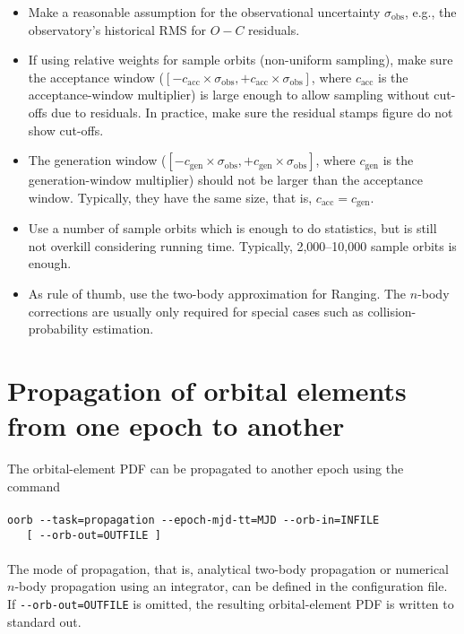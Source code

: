 \documentclass[12pt,english,twoside,a4paper]{report}
\begin{document}
\begin{itemize}

\item Make a reasonable assumption for the observational uncertainty
  $\sigma_\mathrm{obs}$, e.g., the observatory's historical RMS for
  $O-C$ residuals.

\item If using relative weights for sample orbits (non-uniform
  sampling), make sure the acceptance window ($[-c_\mathrm{acc} \times
    \sigma_\mathrm{obs},+c_\mathrm{acc} \times \sigma_\mathrm{obs}]$,
  where $c_\mathrm{acc}$ is the acceptance-window multiplier) is large
  enough to allow sampling without cut-offs due to residuals. In
  practice, make sure the residual stamps figure do not show cut-offs.

\item The generation window ($[-c_\mathrm{gen} \times
  \sigma_\mathrm{obs},+c_\mathrm{gen} \times \sigma_\mathrm{obs}]$,
  where $c_\mathrm{gen}$ is the generation-window multiplier) should
  not be larger than the acceptance window. Typically, they have the
  same size, that is, $c_\mathrm{acc}=c_\mathrm{gen}$.

\item Use a number of sample orbits which is enough to do statistics,
  but is still not overkill considering running time. Typically,
  2,000--10,000 sample orbits is enough.

\item As rule of thumb, use the two-body approximation for
  Ranging. The $n$-body corrections are usually only required for
  special cases such as collision-probability estimation.

\end{itemize}

\section{Propagation of orbital elements from one epoch to another}

The orbital-element PDF can be propagated to another epoch using
the command \\ \\
\verb|oorb --task=propagation --epoch-mjd-tt=MJD --orb-in=INFILE| \\
\verb|   [ --orb-out=OUTFILE ]| \\ \\
The mode of propagation, that is, analytical two-body propagation or
numerical $n$-body propagation using an integrator, can be defined in
the configuration file. If \verb|--orb-out=OUTFILE| is omitted, the
resulting orbital-element PDF is written to standard out.
\end{document}
